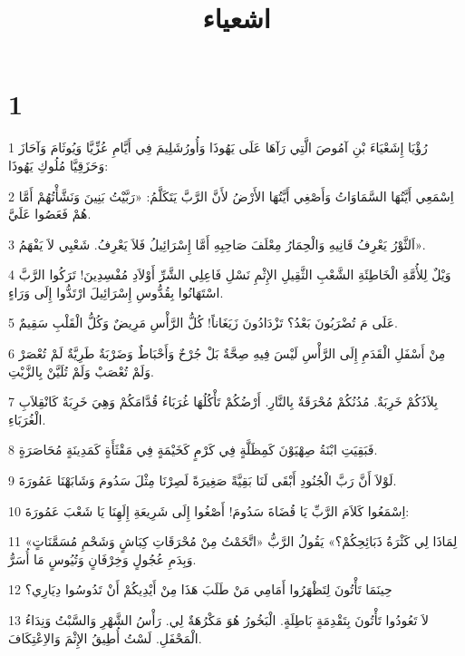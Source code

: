 

\title{اشعياء}


\chapter{1}

\par 1 رُؤْيَا إِشَعْيَاءَ بْنِ آمُوصَ الَّتِي رَآهَا عَلَى يَهُوذَا وَأُورُشَلِيمَ فِي أَيَّامِ عُزِّيَّا وَيُوثَامَ وَآحَازَ وَحَزَقِيَّا مُلُوكِ يَهُوذَا:
\par 2 اِسْمَعِي أَيَّتُهَا السَّمَاوَاتُ وَأَصْغِي أَيَّتُهَا الأَرْضُ لأَنَّ الرَّبَّ يَتَكَلَّمُ: «رَبَّيْتُ بَنِينَ وَنَشَّأْتُهُمْ أَمَّا هُمْ فَعَصُوا عَلَيَّ.
\par 3 اَلثَّوْرُ يَعْرِفُ قَانِيهِ وَالْحِمَارُ مِعْلَفَ صَاحِبِهِ أَمَّا إِسْرَائِيلُ فَلاَ يَعْرِفُ. شَعْبِي لاَ يَفْهَمُ».
\par 4 وَيْلٌ لِلأُمَّةِ الْخَاطِئَةِ الشَّعْبِ الثَّقِيلِ الإِثْمِ نَسْلِ فَاعِلِي الشَّرِّ أَوْلاَدِ مُفْسِدِينَ! تَرَكُوا الرَّبَّ اسْتَهَانُوا بِقُدُّوسِ إِسْرَائِيلَ ارْتَدُّوا إِلَى وَرَاءٍ.
\par 5 عَلَى مَ تُضْرَبُونَ بَعْدُ؟ تَزْدَادُونَ زَيَغَاناً! كُلُّ الرَّأْسِ مَرِيضٌ وَكُلُّ الْقَلْبِ سَقِيمٌ.
\par 6 مِنْ أَسْفَلِ الْقَدَمِ إِلَى الرَّأْسِ لَيْسَ فِيهِ صِحَّةٌ بَلْ جُرْحٌ وَأَحْبَاطٌ وَضَرْبَةٌ طَرِيَّةٌ لَمْ تُعْصَرْ وَلَمْ تُعْصَبْ وَلَمْ تُلَيَّنْ بِالزَّيْتِ.
\par 7 بِلاَدُكُمْ خَرِبَةٌ. مُدُنُكُمْ مُحْرَقَةٌ بِالنَّارِ. أَرْضُكُمْ تَأْكُلُهَا غُرَبَاءُ قُدَّامَكُمْ وَهِيَ خَرِبَةٌ كَانْقِلاَبِ الْغُرَبَاءِ.
\par 8 فَبَقِيَتِ ابْنَةُ صِهْيَوْنَ كَمِظَلَّةٍ فِي كَرْمٍ كَخَيْمَةٍ فِي مَقْثَأَةٍ كَمَدِينَةٍ مُحَاصَرَةٍ.
\par 9 لَوْلاَ أَنَّ رَبَّ الْجُنُودِ أَبْقَى لَنَا بَقِيَّةً صَغِيرَةً لَصِرْنَا مِثْلَ سَدُومَ وَشَابَهْنَا عَمُورَةَ.
\par 10 اِسْمَعُوا كَلاَمَ الرَّبِّ يَا قُضَاةَ سَدُومَ! أَصْغُوا إِلَى شَرِيعَةِ إِلَهِنَا يَا شَعْبَ عَمُورَةَ:
\par 11 «لِمَاذَا لِي كَثْرَةُ ذَبَائِحِكُمْ؟» يَقُولُ الرَّبُّ «اتَّخَمْتُ مِنْ مُحْرَقَاتِ كِبَاشٍ وَشَحْمِ مُسَمَّنَاتٍ وَبِدَمِ عُجُولٍ وَخِرْفَانٍ وَتُيُوسٍ مَا أُسَرُّ.
\par 12 حِينَمَا تَأْتُونَ لِتَظْهَرُوا أَمَامِي مَنْ طَلَبَ هَذَا مِنْ أَيْدِيكُمْ أَنْ تَدُوسُوا دِيَارِي؟
\par 13 لاَ تَعُودُوا تَأْتُونَ بِتَقْدِمَةٍ بَاطِلَةٍ. الْبَخُورُ هُوَ مَكْرُهَةٌ لِي. رَأْسُ الشَّهْرِ وَالسَّبْتُ وَنِدَاءُ الْمَحْفَلِ. لَسْتُ أُطِيقُ الإِثْمَ وَالاِعْتِكَافَ.
